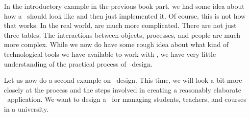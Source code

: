 %
%
In the introductory example in the previous book part, we had some idea about how a \db\ should look like and then just implemented it.
Of course, this is not how that works.
In the real world,  are much more complicated.
There are not just three tables.
The interactions between objects, processes, and people are much more complex.
While we now do have some rough idea about what kind of technological tools we have available to work with , we have very little understanding of the practical process of \db\ design.

Let us now do a second example on \db\ design.
This time, we will look a bit more closely at the process and the steps involved in creating a reasonably elaborate \db\ application.
We want to design a \db\ for managing students, teachers, and courses in a university.%
%
%
%
%
%
%
%
\endhsection%
%
